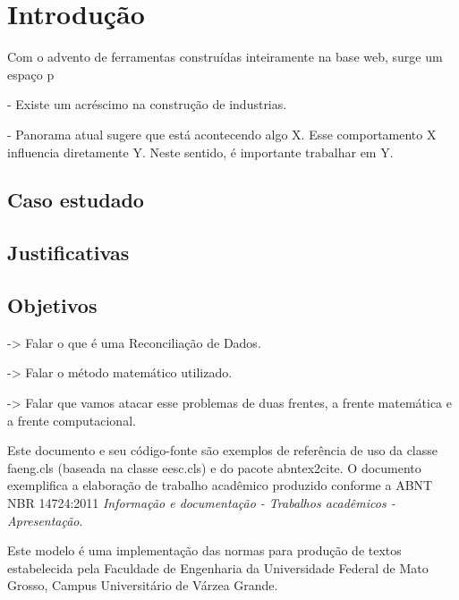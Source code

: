 \chapter[Introdução]{Introdução}

Com o advento de ferramentas construídas inteiramente na base web, surge um espaço p


- Existe um acréscimo na construção de industrias.


- Panorama atual sugere que está acontecendo algo X. Esse comportamento X influencia diretamente Y. Neste sentido, é importante trabalhar em Y.


\section{Caso estudado}


\section{Justificativas}


\section{Objetivos}

-> Falar o que é uma Reconciliação de Dados.

-> Falar o método matemático utilizado.

-> Falar que vamos atacar esse problemas de duas frentes, a frente matemática e a frente computacional.

Este documento e seu código-fonte são exemplos de referência de uso da classe \textsf{faeng.cls} (baseada na classe \textsf{eesc.cls}) e do pacote \textsf{abntex2cite}. O documento exemplifica a elaboração de trabalho acadêmico produzido conforme a \ac{ABNT} \ac{NBR} 14724:2011 \emph{Informação e documentação - Trabalhos acadêmicos - Apresentação}.

Este modelo é uma implementação das normas para produção de textos estabelecida pela Faculdade de Engenharia da Universidade Federal de Mato Grosso, Campus Universitário de Várzea Grande.